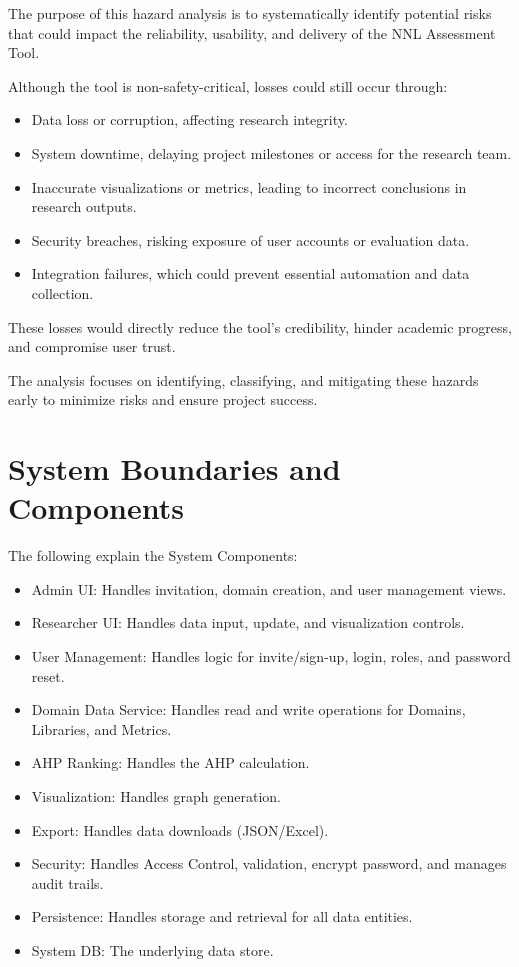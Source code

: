 \documentclass{article}
\begin{document}
The purpose of this hazard analysis is to systematically identify potential
risks that could impact the reliability, usability, and delivery of the NNL
Assessment Tool.

Although the tool is non-safety-critical, losses could still occur through:

\begin{itemize}
    \item Data loss or corruption, affecting research integrity.
    \item System downtime, delaying project milestones or access for the research team.
    \item Inaccurate visualizations or metrics, leading to incorrect conclusions in research outputs.
    \item Security breaches, risking exposure of user accounts or evaluation data.
    \item Integration failures, which could prevent essential automation and data collection.
\end{itemize}

These losses would directly reduce the tool’s credibility, hinder academic
progress, and compromise user trust.

The analysis focuses on identifying, classifying, and mitigating these hazards
early to minimize risks and ensure project success.

\section{System Boundaries and Components}

The following explain the System Components:
\begin{itemize}
    \item Admin UI: Handles invitation, domain creation, and user management views.
    \item Researcher UI: Handles data input, update, and visualization controls.
    \item User Management: Handles logic for invite/sign-up, login, roles, and password reset.
    \item Domain Data Service: Handles read and write operations for Domains, Libraries, and Metrics.
    \item AHP Ranking: Handles the AHP calculation.
    \item Visualization: Handles graph generation.
    \item Export: Handles data downloads (JSON/Excel).
    \item Security: Handles Access Control, validation, encrypt password, and manages audit trails.
    \item Persistence: Handles storage and retrieval for all data entities.
    \item System DB: The underlying data store.
\end{itemize}
\end{document}
